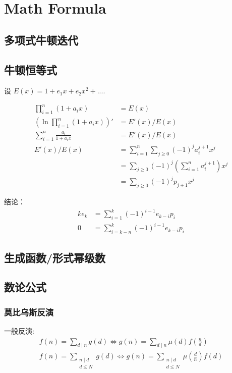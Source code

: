 \section{Math Formula}

\subsection{多项式牛顿迭代}

\subsection{牛顿恒等式}
设 $E(x)=1+e_1x+e_2x^2+...$.

\begin{equation*}
    \begin{aligned}
        \prod_{i=1}^n (1+a_ix)&=E(x)\\
        (\ln \prod_{i=1}^n (1+a_ix))'&=E'(x)/E(x)\\
        \sum_{i=1}^n \frac{a_i}{1+a_ix}&=E'(x)/E(x)\\
        E'(x)/E(x)&=\sum_{i=1}^n\sum_{j\ge 0}(-1)^{j}a_i^{j+1}x^j\\
        &=\sum_{j\ge 0}(-1)^j\left(\sum_{i=1}^n a_i^{j+1}\right)x^j\\
        &=\sum_{j\ge 0}(-1)^j p_{j+1} x^j
    \end{aligned}
\end{equation*}

结论：
\begin{equation*}
    \begin{aligned}
        ke_k&=\sum_{i=1}^{k}(-1)^{i-1}e_{k-i}p_i\\
        0&=\sum_{i=k-n}^k(-1)^{i-1}e_{k-i}p_i
    \end{aligned}
\end{equation*}

\subsection{生成函数/形式幂级数}

\subsection{数论公式}
\subsubsection{莫比乌斯反演}
一般反演:
\begin{equation*}
    \begin{aligned}
        f(n)=\sum_{d\mid n}g(d) \Longleftrightarrow g(n)=\sum_{d\mid n} \mu (d)f(\frac{n}{d})\\
        f(n)=\sum_{\substack{n\mid d\\ d\le N}}g(d) \Longleftrightarrow g(n)=\sum_{\substack{n\mid d\\ d\le N}} \mu (\frac{d}{n})f(d)
    \end{aligned}
\end{equation*}

